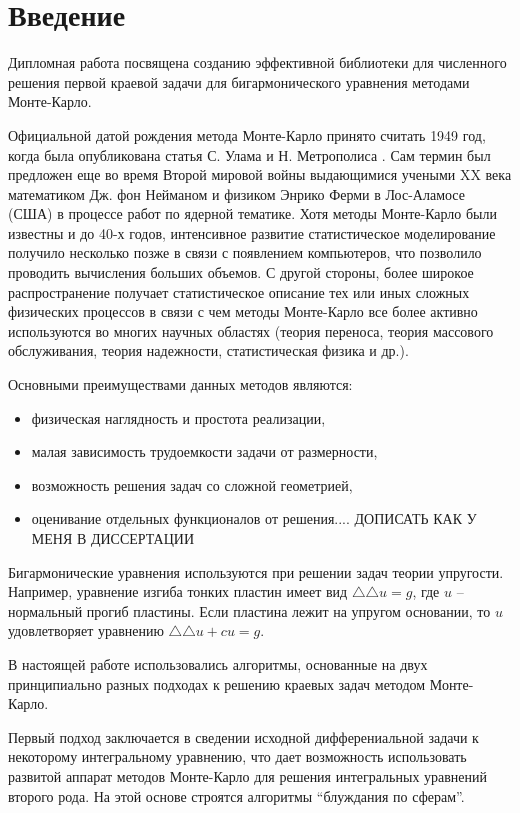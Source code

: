 \chapter*{Введение}

Дипломная работа посвящена созданию эффективной библиотеки для численного решения первой краевой задачи для бигармонического уравнения методами Монте-Карло. 

Официальной датой рождения метода Монте-Карло принято считать 1949 год, когда была опубликована статья С. Улама и Н. Метрополиса \cite{int:fist} . Сам термин был предложен еще во время Второй мировой войны выдающимися учеными XX века математиком Дж. фон Нейманом и физиком Энрико Ферми в Лос-Аламосе (США) в процессе работ по ядерной тематике. Хотя методы Монте-Карло были известны и до 40-х годов, интенсивное развитие статистическое моделирование получило несколько позже в связи с появлением компьютеров, что позволило проводить вычисления больших объемов. С другой стороны, более широкое распространение получает статистическое описание тех или иных сложных физических процессов в связи с чем методы Монте-Карло все более активно используются во многих научных областях (теория переноса, теория массового обслуживания, теория надежности, статистическая физика и др.).

Основными преимуществами данных методов являются:

\begin{itemize}
	\item физическая наглядность и простота реализации,
	\item малая зависимость трудоемкости задачи от размерности,
	\item возможность решения задач со сложной геометрией,
	\item оценивание отдельных функционалов от решения.... ДОПИСАТЬ КАК У МЕНЯ В ДИССЕРТАЦИИ
\end{itemize}

Бигармонические уравнения используются при решении задач теории упругости. Например, уравнение
изгиба тонких пластин имеет вид $\triangle\triangle u = g$, где $u$ --
нормальный прогиб пластины. Если пластина лежит на упругом
основании, то $u$ удовлетворяет уравнению $\triangle\triangle u
+cu=g$.

В настоящей работе использовались алгоритмы, основанные на двух принципиально разных подходах к решению краевых задач методом Монте-Карло.

Первый подход заключается в сведении исходной дифферениальной задачи к некоторому интегральному уравнению, что дает возможность использовать развитой аппарат методов Монте-Карло для решения интегральных уравнений второго рода. На этой основе строятся алгоритмы ``блуждания по сферам''.
   
